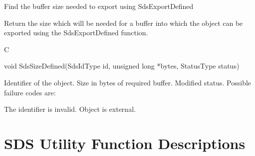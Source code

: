 \begin{manroutinedescription}
      Find the buffer size needed to export using SdsExportDefined

      Return the size which will be needed for a buffer into which the object
      can be exported using the SdsExportDefined function.
 
      C

      void SdsSizeDefined(SdsIdType id, unsigned long *bytes, StatusType {%
\mantt{*}} {} status)
 
\begin{manparametertable}
  Identifier of the object.
 Size in bytes of %
required buffer.
 Modified status. Possible %
failure codes are:
\end{manparametertable}
\begin{mantwocolumntable}
The identifier is invalid.
Object is external.
\end{mantwocolumntable}
\end{manroutinedescription}



\newpage
\section{SDS Utility Function Descriptions}
\label{SDS-utility-functions}

